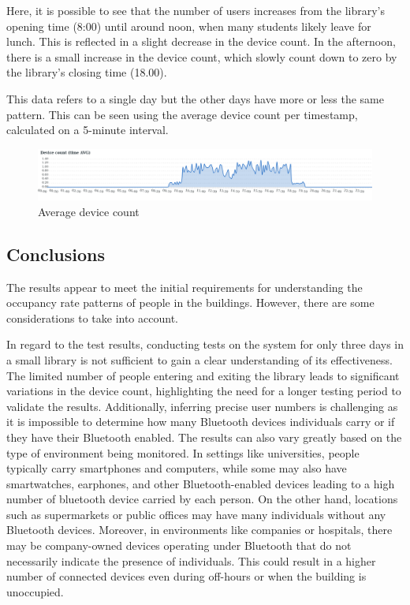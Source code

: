 \documentclass[a4paper, 11pt]{article}
\begin{document}
Here, it is possible to see that the number of users increases from the library's opening time (8:00) until around noon, when many students likely leave for lunch. This is reflected in a slight decrease in the device count. In the afternoon, there is a small increase in the device count, which slowly count down to zero by the library's closing time (18.00).

This data refers to a single day but the other days have more or less the same pattern. This can be seen using the average device count per timestamp, calculated on a 5-minute interval.

\begin{figure}[H]
    \centering
    \includegraphics[width=1\linewidth]{images/reyw2zjfg.png}
    \caption{Average device count}
\end{figure}

\subsection{Conclusions}
The results appear to meet the initial requirements for understanding the occupancy rate patterns of people in the buildings. However, there are some considerations to take into account.

In regard to the test results, conducting tests on the system for only three days in a small library is not sufficient to gain a clear understanding of its effectiveness. The limited number of people entering and exiting the library leads to significant variations in the device count, highlighting the need for a longer testing period to validate the results. Additionally, inferring precise user numbers is challenging as it is impossible to determine how many Bluetooth devices individuals carry or if they have their Bluetooth enabled. The results can also vary greatly based on the type of environment being monitored. In settings like universities, people typically carry smartphones and computers, while some may also have smartwatches, earphones, and other Bluetooth-enabled devices leading to a high number of bluetooth device carried by each person. On the other hand, locations such as supermarkets or public offices may have many individuals without any Bluetooth devices. Moreover, in environments like companies or hospitals, there may be company-owned devices operating under Bluetooth that do not necessarily indicate the presence of individuals. This could result in a higher number of connected devices even during off-hours or when the building is unoccupied.
\end{document}
